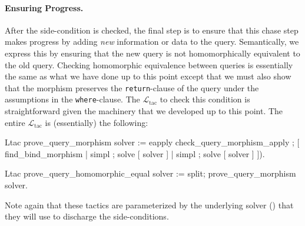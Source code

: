 \documentclass[preprint]{sigplanconf}
\newcommand{\WHERE}{{\tt where} \ }
\newcommand{\RETURN}{{\tt return} \ }
\newcommand{\ltac}[0]{\ensuremath{\mathcal{L}_{\mathrm{tac}}}}
\begin{document}
\paragraph{Ensuring Progress.}
After the side-condition is checked, the final step is to ensure that this chase step makes progress by adding \emph{new} information or data to the query.
Semantically, we express this by ensuring that the new query is not homomorphically equivalent to the old query.
Checking homomorphic equivalence between queries is essentially the same as what we have done up to this point except that we must also show that the morphism preserves the {\tt return}-clause of the query under the assumptions in the {\tt where}-clause.
The \ltac{} to check this condition is straightforward given the machinery that we developed up to this point.
The entire \ltac{} is (essentially) the following:
\begin{coq}
Ltac prove_query_morphism solver :=
  eapply check_query_morphism_apply ;
    [ find_bind_morphism
    | simpl ; solve [ solver ]
    | simpl ; solve [ solver ] ]).

Ltac prove_query_homomorphic_equal solver :=
  split; prove_query_morphism solver.
\end{coq}
Note again that these tactics are parameterized by the underlying solver () that they will use to discharge the side-conditions.
\end{document}

